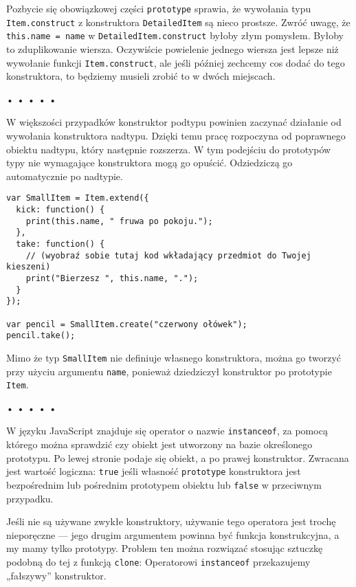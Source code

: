 Pozbycie się obowiązkowej części \texttt{prototype} sprawia, że wywołania typu \texttt{Item.construct} z konstruktora \texttt{DetailedItem} są nieco prostsze. Zwróć uwagę, że \texttt{this.name = name} w \texttt{DetailedItem.construct} byłoby złym pomysłem. Byłoby to zduplikowanie wiersza. Oczywiście powielenie jednego wiersza jest lepsze niż wywołanie funkcji \texttt{Item.construct}, ale jeśli później zechcemy cos dodać do tego konstruktora, to będziemy musieli zrobić to w dwóch miejscach.



\begin{center}
• • • • •
\end{center}

  
W większości przypadków konstruktor podtypu powinien zaczynać działanie od wywołania konstruktora nadtypu. Dzięki temu pracę rozpoczyna od poprawnego obiektu nadtypu, który następnie rozszerza. W tym podejściu do prototypów typy nie wymagające konstruktora mogą go opuścić. Odziedziczą go automatycznie po nadtypie.

  
\begin{verbatim} 
var SmallItem = Item.extend({
  kick: function() {
    print(this.name, " fruwa po pokoju.");
  },
  take: function() {
    // (wyobraź sobie tutaj kod wkładający przedmiot do Twojej kieszeni)
    print("Bierzesz ", this.name, ".");
  }
});

var pencil = SmallItem.create("czerwony ołówek");
pencil.take();
 \end{verbatim}
  
Mimo że typ \texttt{SmallItem} nie definiuje własnego konstruktora, można go tworzyć przy użyciu argumentu \texttt{name}, ponieważ dziedziczył konstruktor po prototypie \texttt{Item}.



\begin{center}
• • • • •
\end{center}

  
W języku JavaScript znajduje się operator o nazwie \texttt{instanceof}, za pomocą którego można sprawdzić czy obiekt jest utworzony na bazie określonego prototypu. Po lewej stronie podaje się obiekt, a po prawej konstruktor. Zwracana jest wartość logiczna: \texttt{true} jeśli własność \texttt{prototype} konstruktora jest bezpośrednim lub pośrednim prototypem obiektu lub \texttt{false} w przeciwnym przypadku.

  
Jeśli nie są używane zwykłe konstruktory, używanie tego operatora jest trochę nieporęczne — jego drugim argumentem powinna być funkcja konstrukcyjna, a my mamy tylko prototypy. Problem ten można rozwiązać stosując sztuczkę podobną do tej z funkcją \texttt{clone}: Operatorowi \texttt{instanceof} przekazujemy „fałszywy” konstruktor.

